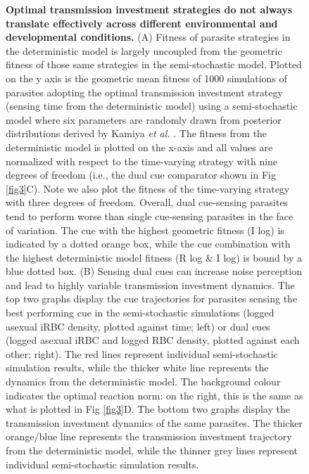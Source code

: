 \documentclass[10pt,letterpaper]{article}
\begin{document}
\begin{figure}[!h]
\caption{{\bf Optimal transmission investment strategies do not always translate effectively across different environmental and developmental conditions.} 
(A) Fitness of parasite strategies in the deterministic model is largely uncoupled from the geometric fitness of those same strategies in the semi-stochastic model. Plotted on the y axis is the geometric mean fitness of 1000 simulations of parasites adopting the optimal transmission investment strategy (sensing time from the deterministic model) using a semi-stochastic model where six parameters are randomly drawn from posterior distributions derived by Kamiya \emph{et al.} \cite{kamiya_uncovering_2020}. The fitness from the deterministic model is plotted on the x-axis and all values are normalized with respect to the time-varying strategy with nine degrees of freedom (i.e., the dual cue comparator shown in Fig \ref{fig3}C). Note we also plot the fitness of the time-varying strategy with three degrees of freedom. Overall, dual cue-sensing parasites tend to perform worse than single cue-sensing parasites in the face of variation. The cue with the highest geometric fitness (I log) is indicated by a dotted orange box, while the cue combination with the highest deterministic model fitness (R log \& I log) is bound by a blue dotted box. (B) Sensing dual cues can increase noise perception and lead to highly variable transmission investment dynamics. The top two graphs display the cue trajectories for parasites sensing the best performing cue in the semi-stochastic simulations (logged asexual iRBC density, plotted against time; left) or dual cues (logged asexual iRBC and logged RBC density, plotted against each other; right). The red lines represent individual semi-stochastic simulation results, while the thicker white line represents the dynamics from the deterministic model. The background colour indicates the optimal reaction norm: on the right, this is the same as what is plotted in Fig \ref{fig3}D. The bottom two graphs display the transmission investment dynamics of the same parasites. The thicker orange/blue line represents the transmission investment trajectory from the deterministic model, while the thinner grey lines represent individual semi-stochastic simulation results.
}
\label{fig5}
\end{figure}
\end{document}
